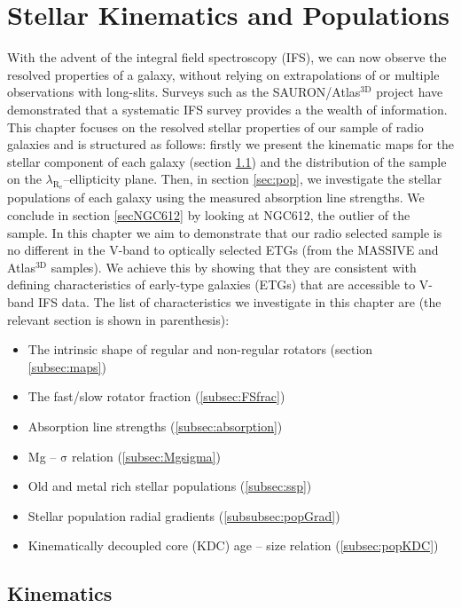 \chapter{Stellar Kinematics and Populations}
	\label{cha:stellar}
With the advent of the integral field spectroscopy (IFS), we can now observe the resolved properties of a galaxy, without relying on extrapolations of or multiple observations with long-slits. Surveys such as the SAURON/Atlas$^\text{3D}$ project have demonstrated that a systematic IFS survey provides a the wealth of information. This chapter focuses on the resolved stellar properties of our sample of radio galaxies and is structured as follows: firstly we present the kinematic maps for the stellar component of each galaxy (section \ref{sec:stellarKin}) and the distribution of the sample on the $\lambda_\mathrm{R_e}$--ellipticity plane. Then, in section \ref{sec:pop}, we investigate the stellar populations of each galaxy using the measured absorption line strengths. We conclude in section \ref{secNGC612} by looking at NGC612, the outlier of the sample. In this chapter we aim to demonstrate that our radio selected sample is no different in the V-band to optically selected ETGs (from the MASSIVE and Atlas$^\text{3D}$ samples). We achieve this by showing that they are consistent with defining characteristics of early-type galaxies (ETGs) that are accessible to V-band IFS data. The list of characteristics we investigate in this chapter are (the relevant section is shown in parenthesis):
\begin{itemize}
	\item The intrinsic shape of regular and non-regular rotators (section \ref{subsec:maps})
	\item The fast/slow rotator fraction (\ref{subsec:FSfrac})
	\item Absorption line strengths (\ref{subsec:absorption})
	\item Mg -- $\mathrm{\sigma}$ relation (\ref{subsec:Mgsigma})
	\item Old and metal rich stellar populations (\ref{subsec:ssp})
	\item Stellar population radial gradients (\ref{subsubsec:popGrad})
	\item Kinematically decoupled core (KDC) age -- size relation (\ref{subsec:popKDC})
\end{itemize}

\section{Kinematics}
	\label{sec:stellarKin}

